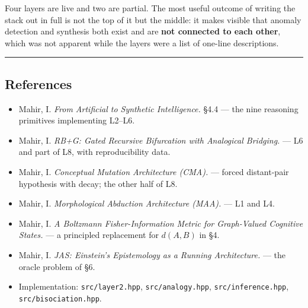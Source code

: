 \documentclass[
  11pt,
  a4paper,
]{article}
\providecommand{\tightlist}{%
  \setlength{\itemsep}{0pt}\setlength{\parskip}{0pt}}
\begin{document}
Four layers are live and two are partial. The most useful outcome of
writing the stack out in full is not the top of it but the middle: it
makes visible that anomaly detection and synthesis both exist and are
\textbf{not connected to each other}, which was not apparent while the
layers were a list of one-line descriptions.

\begin{center}\rule{0.5\linewidth}{0.5pt}\end{center}

\subsection{References}\label{references}

\begin{itemize}
\tightlist
\item
  Mahir, I. \emph{From Artificial to Synthetic Intelligence.} §4.4 ---
  the nine reasoning primitives implementing L2--L6.
\item
  Mahir, I. \emph{RB+G: Gated Recursive Bifurcation with Analogical
  Bridging.} --- L6 and part of L8, with reproducibility data.
\item
  Mahir, I. \emph{Conceptual Mutation Architecture (CMA).} --- forced
  distant-pair hypothesis with decay; the other half of L8.
\item
  Mahir, I. \emph{Morphological Abduction Architecture (MAA).} --- L1
  and L4.
\item
  Mahir, I. \emph{A Boltzmann Fisher-Information Metric for Graph-Valued
  Cognitive States.} --- a principled replacement for \(d(A,B)\) in §4.
\item
  Mahir, I. \emph{JAS: Einstein's Epistemology as a Running
  Architecture.} --- the oracle problem of §6.
\item
  Implementation: \texttt{src/layer2.hpp}, \texttt{src/analogy.hpp},
  \texttt{src/inference.hpp}, \texttt{src/bisociation.hpp}.
\end{itemize}
\end{document}
